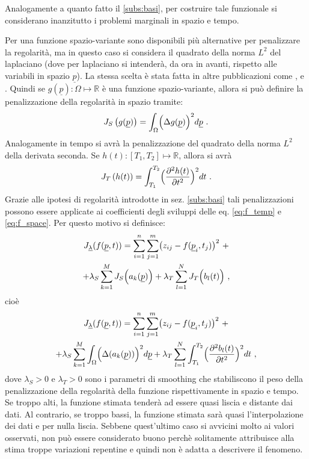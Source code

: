 \documentclass[a4paper,11pt,twoside,openright]{book}							%
\begin{document}
Analogamente a quanto fatto il \ref{subs:basi}, per costruire tale funzionale si considerano inanzitutto i problemi marginali in spazio e tempo.

Per una funzione spazio-variante sono disponibili più alternative per penalizzare la regolarità, ma in questo caso si considera il quadrato della norma $L^2$ del laplaciano (dove per laplaciano si intenderà, da ora in avanti, rispetto alle variabili in spazio $\underline p$). La stessa scelta è stata fatta in altre pubblicazioni come \cite{art:ramsay}, \cite{art:sangalli} e \cite{art:wood}. Quindi se $g(\underline p): \Omega \mapsto \mathbb{R}$ è una funzione spazio-variante, allora si può definire la penalizzazione della regolarità in spazio tramite:
$$
J_S\left(g(\underline p)\right)=\int_{\Omega} \Bigl( \Delta  g(\underline p  ) \Bigr)^2 d \underline p \ .
$$
Analogamente in tempo si avrà la penalizzazione del quadrato della norma $L^2$ della derivata seconda. Se $h(t): [T_1,T_2] \mapsto \mathbb{R}$, allora si avrà
$$
J_T\left(h(t)\right)=\int_{T_1}^{T_2} \Bigl( \frac{\partial^2   h(t)   }{\partial t ^2} \Bigr)^2 dt\ .
$$
Grazie alle ipotesi di regolarità introdotte in sez. \ref{subs:basi} tali penalizzazioni possono essere applicate ai coefficienti degli sviluppi delle eq. \ref{eq:f_temp} e \ref{eq:f_space}. Per questo motivo si definisce:
\begin{multline*}
J_{\underline \lambda }(f(\underline p,t))=\sum_{i=1}^n \sum_{j=1}^m \bigl( z_{ij} - f(\underline p_i,t_j) \bigr)^2 \ + \\
+\lambda_S  \sum_{k=1}^M J_S\Bigl( a_k(\underline p)\Bigr) + \lambda_T \sum_{l=1}^N J_T \Bigl( b_l(t)\Bigr) \ ,
\end{multline*}
cioè
\begin{multline}
\label{eq:penalizzdisc}
J_{\underline \lambda }(f(\underline p,t))=\sum_{i=1}^n \sum_{j=1}^m \bigl( z_{ij} - f(\underline p_i,t_j) \bigr)^2 \ + \\
+\lambda_S  \sum_{k=1}^M \int_{\Omega} \Bigl( \Delta(  a_k(\underline p)  ) \Bigr)^2 d \underline p + \lambda_T \sum_{l=1}^N\int_{T_1}^{T_2} \Bigl( \frac{\partial^2   b_l(t)   }{\partial t ^2} \Bigr)^2 dt \ ,
\end{multline}
dove $\lambda_S>0$ e $\lambda_T>0$ sono i parametri di smoothing che stabiliscono il peso della penalizzazione della regolarità della funzione rispettivamente in spazio e tempo. Se troppo alti, la funzione stimata tenderà ad essere quasi liscia e distante dai dati. Al contrario, se troppo bassi, la funzione stimata sarà quasi l'interpolazione dei dati e per nulla liscia. Sebbene quest'ultimo caso si avvicini molto ai valori osservati, non può essere considerato buono perchè solitamente attribuisce alla stima troppe variazioni repentine e quindi non è adatta a descrivere il fenomeno.
\end{document}
